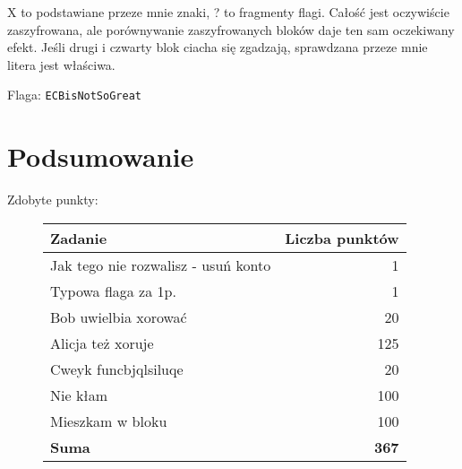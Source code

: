 \documentclass[a4paper]{article}
\begin{document}
X to podstawiane przeze mnie znaki, ? to fragmenty flagi. Całość jest oczywiście zaszyfrowana, ale porównywanie zaszyfrowanych bloków daje ten sam oczekiwany efekt. Jeśli drugi i czwarty blok ciacha się zgadzają, sprawdzana przeze mnie litera jest właściwa.

Flaga: \texttt{ECBisNotSoGreat}


\section{Podsumowanie}
Zdobyte punkty:
\begin{figure}[H]
	\centering
	\begin{tabular}{|l|r|}
		\hline 
		\textbf{Zadanie} & \textbf{Liczba punktów} \\ 
		\hline 
		\hline
		Jak tego nie rozwalisz - usuń konto & 1 \\ 
		\hline
		Typowa flaga za 1p. & 1 \\ 
		\hline
		\hline
		Bob uwielbia xorować & 20 \\ 
		\hline 
		Alicja też xoruje & 125 \\ 
		\hline 
		Cweyk funcbjqlsiluqe & 20 \\ 
		\hline   
		Nie kłam & 100 \\ 
		\hline 
		Mieszkam w bloku & 100 \\ 
		\hline 
		\hline
		\textbf{Suma} & \textbf{367} \\ 
		\hline 
	\end{tabular} 
\end{figure}
\end{document}
